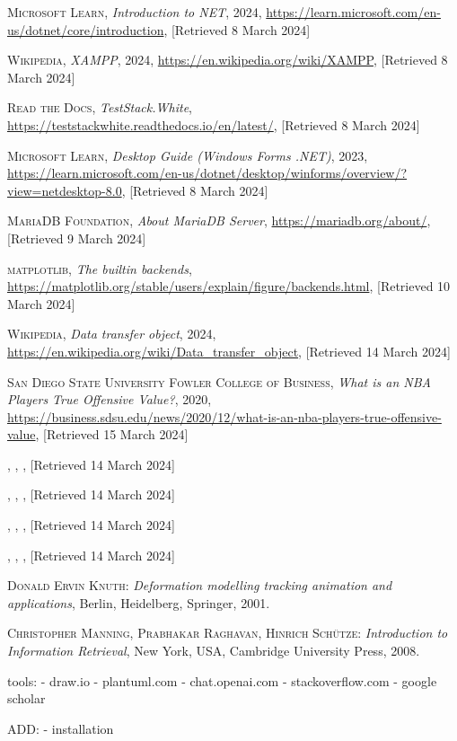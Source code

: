 \documentclass{thesis-ekf}
\theoremstyle{definition}
\theoremstyle{remark}
\begin{document}
\begin{thebibliography}{2}
\textsc{Microsoft Learn},
\emph{Introduction to NET}, 2024, 
\url{https://learn.microsoft.com/en-us/dotnet/core/introduction}, [Retrieved 8 March 2024]

\textsc{Wikipedia},
\emph{XAMPP}, 2024,
\url{https://en.wikipedia.org/wiki/XAMPP}, [Retrieved 8 March 2024]

\textsc{Read the Docs},
\emph{TestStack.White},
\url{https://teststackwhite.readthedocs.io/en/latest/}, [Retrieved 8 March 2024]

\textsc{Microsoft Learn},
\emph{Desktop Guide (Windows Forms .NET)}, 2023,
\url{https://learn.microsoft.com/en-us/dotnet/desktop/winforms/overview/?view=netdesktop-8.0}, [Retrieved 8 March 2024]

\textsc{MariaDB Foundation},
\emph{About MariaDB Server},
\url{https://mariadb.org/about/}, [Retrieved 9 March 2024]

\textsc{matplotlib},
\emph{The builtin backends},
\url{https://matplotlib.org/stable/users/explain/figure/backends.html}, [Retrieved 10 March 2024]

\textsc{Wikipedia},
\emph{Data transfer object}, 2024,
\url{https://en.wikipedia.org/wiki/Data_transfer_object}, [Retrieved 14 March 2024]

\textsc{San Diego State University Fowler College of Business},
\emph{What is an NBA Players True Offensive Value?}, 2020,
\url{https://business.sdsu.edu/news/2020/12/what-is-an-nba-players-true-offensive-value}, [Retrieved 15 March 2024]

\bibitem{}
\textsc{},
\emph{},
\url{}, [Retrieved 14 March 2024]

\bibitem{}
\textsc{},
\emph{},
\url{}, [Retrieved 14 March 2024]

\bibitem{}
\textsc{},
\emph{},
\url{}, [Retrieved 14 March 2024]

\bibitem{}
\textsc{},
\emph{},
\url{}, [Retrieved 14 March 2024]

\textsc{Donald Ervin Knuth}: 
\emph{Deformation modelling tracking animation and applications}, Berlin, Heidelberg, Springer, 2001.

\textsc{Christopher Manning, Prabhakar Raghavan, Hinrich Sch\"{u}tze}: 
\emph{Introduction to Information Retrieval}, New York, USA, Cambridge University Press, 2008.
\end{thebibliography}

tools:
- draw.io
- plantuml.com
- chat.openai.com
- stackoverflow.com
- google scholar

ADD:
- installation
\end{document}
